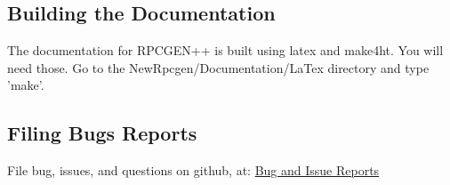 \subsection{Building the Documentation}
The documentation for RPCGEN++ is built using latex and make4ht.
You will need those.
Go to the NewRpcgen/Documentation/LaTex directory
and type 'make'.

\subsection{Filing Bugs Reports}
File bug, issues, and questions on github, at:
\href {https://github.com/RiverExplorer/Phoenix/issues}{Bug and Issue Reports}
